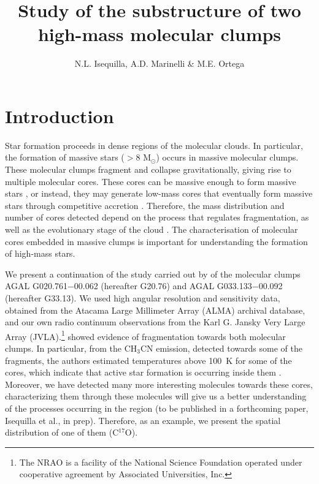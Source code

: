 \documentclass[baaa]{baaa}
\title{Study of the substructure of two high-mass molecular clumps}
\author{N.L. Isequilla\inst{1}, A.D. Marinelli\inst{1} \& M.E. Ortega\inst{1}}
\institute{
Instituto de Astronom{\'\i}a y F{\'\i}sica del Espacio, CONICET--UBA, Argentina}
\begin{document}
\maketitle{}

\section{Introduction} 
\label{S_intro} 

Star formation proceeds in dense regions of the molecular clouds. In particular, the formation of massive stars ($>$8 M$_\odot$) occurs in massive molecular clumps. These molecular clumps fragment and collapse gravitationally, giving rise to multiple molecular cores. These cores can be massive enough to form massive stars \citep{McKee2002}, or instead, they may generate low-mass cores that eventually form massive stars through competitive accretion \citep{Bonnell2008, Sanhueza2019}. Therefore, the mass distribution and number of cores detected depend on the process that regulates fragmentation, as well as the evolutionary stage of the cloud \citep{Moscadelli2021, Palau2018, Kainulainen2013}. The characterisation of molecular cores embedded in massive clumps is important for understanding the formation of high-mass stars.


We present a continuation of the study carried out by \citet{Marinelli22} of the molecular clumps AGAL G020.761$-$00.062 (hereafter G20.76) and AGAL G033.133$-$00.092 (hereafter G33.13). We used high angular resolution and sensitivity data, obtained from the Atacama Large Millimeter Array (ALMA) archival database, and our own radio continuum observations from the Karl G. Jansky Very Large Array (JVLA).\footnote{The NRAO is a facility of the National Science Foundation operated under cooperative agreement by Associated Universities, Inc.} \citet{Marinelli22} showed evidence of fragmentation towards both molecular clumps. In particular, from the CH$_3$CN emission, detected towards some of the fragments,  the authors estimated temperatures above 100~K for some of the cores, which indicate that active star formation is occurring inside them \citep{Remijan2004}.
 Moreover, we have detected many more interesting molecules towards these cores, characterizing them through  these molecules will give us a better understanding of the processes occurring in the region (to be published in a forthcoming paper, Isequilla et al., in prep). Therefore, as an example, we present the spatial distribution of one of them (C$^{17}$O).
\end{document}
